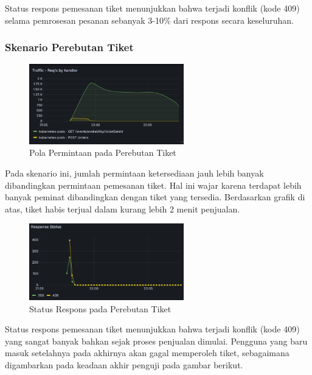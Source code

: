 Status respons pemesanan tiket menunjukkan bahwa terjadi konflik (kode 409) selama pemrosesan pesanan sebanyak 3-10\% dari respons secara keseluruhan.

\pagebreak

\subsubsection{Skenario Perebutan Tiket}

\begin{figure}[htbp]
    \centering
    \includegraphics[width=0.6\textwidth]{resources/chapter-4/pattern-sim-traffic.png}
    \caption{Pola Permintaan pada Perebutan Tiket}
    \label{fig:pattern-sim-traffic}
\end{figure}

Pada skenario ini, jumlah permintaan ketersediaan jauh lebih banyak dibandingkan permintaan pemesanan tiket. Hal ini wajar karena terdapat lebih banyak peminat dibandingkan dengan tiket yang tersedia. Berdasarkan grafik di atas, tiket habis terjual dalam kurang lebih 2 menit penjualan.

\begin{figure}[htbp]
    \centering
    \includegraphics[width=0.6\textwidth]{resources/chapter-4/pattern-sim-order.png}
    \caption{Status Respons pada Perebutan Tiket}
    \label{fig:pattern-sim-order}
\end{figure}

Status respons pemesanan tiket menunjukkan bahwa terjadi konflik (kode 409) yang sangat banyak bahkan sejak proses penjualan dimulai. Pengguna yang baru masuk setelahnya pada akhirnya akan gagal memperoleh tiket, sebagaimana digambarkan pada keadaan akhir penguji pada gambar berikut.

